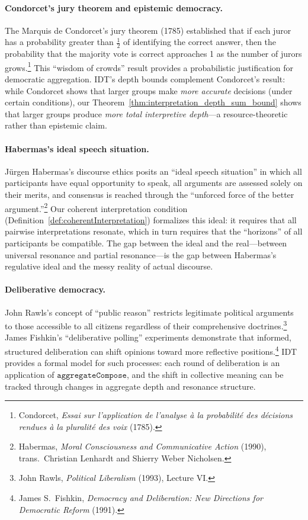 \paragraph{Condorcet's jury theorem and epistemic democracy.}
The Marquis de Condorcet's jury theorem (1785) established that if each
juror has a probability greater than $\frac{1}{2}$ of identifying the
correct answer, then the probability that the majority vote is correct
approaches 1 as the number of jurors grows.\footnote{Condorcet,
\textit{Essai sur l'application de l'analyse \`a la probabilit\'e des
d\'ecisions rendues \`a la pluralit\'e des voix} (1785).}  This ``wisdom of
crowds'' result provides a probabilistic justification for democratic
aggregation.  IDT's depth bounds complement Condorcet's result: while
Condorcet shows that larger groups make \emph{more accurate} decisions
(under certain conditions), our
Theorem~\ref{thm:interpretation_depth_sum_bound} shows that larger groups
produce \emph{more total interpretive depth}---a resource-theoretic rather
than epistemic claim.

\paragraph{Habermas's ideal speech situation.}
J\"urgen Habermas's discourse ethics posits an ``ideal speech situation'' in
which all participants have equal opportunity to speak, all arguments are
assessed solely on their merits, and consensus is reached through the
``unforced force of the better argument.''\footnote{Habermas, \textit{Moral
Consciousness and Communicative Action} (1990), trans.\ Christian Lenhardt
and Shierry Weber Nicholsen.}  Our coherent interpretation condition
(Definition~\ref{def:coherentInterpretation}) formalizes this ideal: it
requires that all pairwise interpretations resonate, which in turn requires
that the ``horizons'' of all participants be compatible.  The gap between
the ideal and the real---between universal resonance and partial
resonance---is the gap between Habermas's regulative ideal and the
messy reality of actual discourse.

\paragraph{Deliberative democracy.}
John Rawls's concept of ``public reason'' restricts legitimate political
arguments to those accessible to all citizens regardless of their
comprehensive doctrines.\footnote{John Rawls, \textit{Political Liberalism}
(1993), Lecture VI.}  James Fishkin's ``deliberative polling'' experiments
demonstrate that informed, structured deliberation can shift opinions toward
more reflective positions.\footnote{James S.\ Fishkin, \textit{Democracy
and Deliberation: New Directions for Democratic Reform} (1991).}  IDT
provides a formal model for such processes: each round of deliberation is
an application of $\texttt{aggregateCompose}$, and the shift in collective
meaning can be tracked through changes in aggregate depth and resonance
structure.

